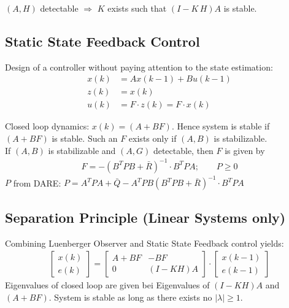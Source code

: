 \documentclass[landscape,a4paper,8pt]{scrartcl}
\begin{document}
\begin{multicols*}{3}
$(A,H)$ detectable $ \Rightarrow$ $K$ exists such that $(I-K \, H) A$ is stable.

\subsection{Static State Feedback Control}
Design of a controller without paying attention to the state estimation:
\begin{align*}
x(k) &= A x(k-1) + B u(k-1) \tag{Process without noise} \\
z(k) &= x(k)  \tag{Perfect State information} \\
u(k) &= F \cdot z(k) = F \cdot x(k) \tag{Control Law}
\end{align*}

Closed loop dynamics: $x(k) = (A+B F)$. Hence system is stable if $(A+B F)$ is stable. Such an $F$ exists only if $(A,B)$ is stabilizable. \\
If $(A,B)$ is stabilizable and $(A,G)$ detectable, then $F$ is given by
\begin{align*}
F = -(B^T P B + \bar{R})^{-1} \cdot B^T P A; \qquad P\geq 0
\end{align*}
$P$ from DARE: $P = A^T P A + \bar{Q} - A^T P B( B^T P B + \bar{R})^{-1} \cdot B^T P A$



\subsection{Separation Principle (Linear Systems only)}
Combining Luenberger Observer and Static State Feedback control yields:
\begin{align*}
\begin{bmatrix}
x(k) \\ e(k) 
\end{bmatrix}
= 
\begin{bmatrix}
A + BF & - B F \\ 0 & (I-KH) A
\end{bmatrix}
\cdot
\begin{bmatrix}
x(k-1) \\ e(k-1)
\end{bmatrix}
\end{align*}
Eigenvalues of closed loop are given bei Eigenvalues of $(I-KH) A$ and $(A + BF)$. System is stable as long as there exists no $|\lambda| \geq 1$. \\


\end{multicols*}
\end{document}
